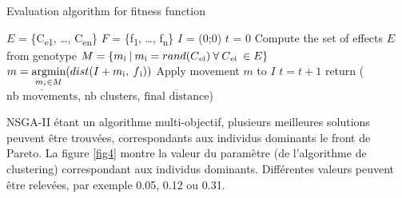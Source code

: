 \documentclass{llncs}
\newcommand{\textoverline}[1]{$\overline{\mbox{#1}}$}
\begin{document}
\begin{algorithm}
\caption{Evaluation algorithm for fitness function}\label{euclid}
  \begin{algorithmic}[1]
    \State $E$ = \{C\textsubscript{e1}, \dots, C\textsubscript{en}\} 
    \State $F$ = \{f\textsubscript{1}, \dots, f\textsubscript{n}\} 
    \State $I$ = (0;0) 
    \State $t$ = 0 
    \State Compute the set of effects $E$ from genotype
            \State $M = \{ m\textsubscript{i}\:|\:m\textsubscript{i} = rand(C\textsubscript{ei})\:\forall\:C\textsubscript{ei}\:\in E\}$
            \State $m = \operatornamewithlimits{argmin}\limits_{m_i \in M}(dist(I+m\textsubscript{i},\:f\textsubscript{i}))$
            \State Apply movement $m$ to $I$
            \State $t = t + 1$
          \EndWhile
        \EndFor
      \EndFor
      \State return (\textoverline{nb movements}, nb clusters, \textoverline{final distance})
  \end{algorithmic}
\end{algorithm}



%

NSGA-II étant un algorithme multi-objectif, plusieurs meilleures solutions peuvent être trouvées, correspondants aux individus dominants le front de Pareto. La figure \ref{fig4} montre la valeur du paramètre (de l'algorithme de clustering) correspondant aux individus dominants. Différentes valeurs peuvent être relevées, par exemple 0.05, 0.12 ou 0.31.
\end{document}

